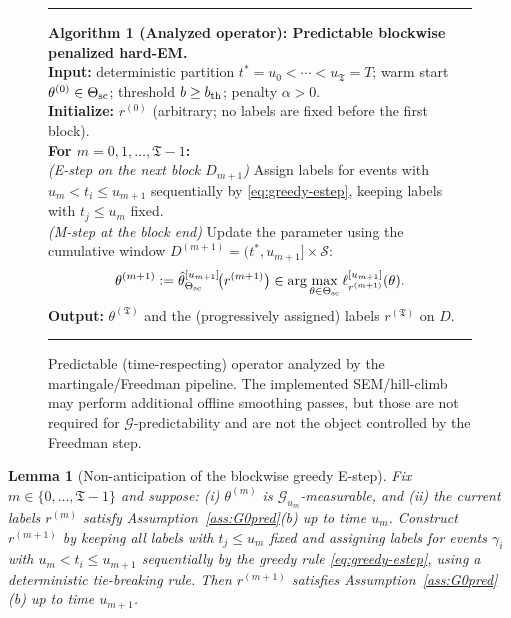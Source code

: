 \documentclass{statsoc}
\newtheorem{lemma}[lemma]{Lemma}
\newcommand{\1}{\mathbbm{1}}
\newcommand{\Tmax}{\mathfrak{T}}
\begin{document}
\begin{figure}[t]
\centering
\begin{minipage}{0.97\linewidth}
\hrule\vspace{0.6em}
\textbf{Algorithm 1 (Analyzed operator): Predictable blockwise penalized hard-EM.}\\[0.3em]
\textbf{Input:} deterministic partition $t^\ast=u_0<\cdots<u_{\Tmax}=T$; warm start $\theta^{(0)}\in\Theta_{\rm sc}$;
threshold $b\ge b_{\rm th}$; penalty $\alpha>0$.\\
\textbf{Initialize:} $r^{(0)}$ (arbitrary; no labels are fixed before the first block).\\[0.2em]
\textbf{For $m=0,1,\dots,\Tmax-1$:}\\
\quad\emph{(E-step on the next block $D_{m+1}$)} Assign labels for events with $u_m<t_i\le u_{m+1}$ sequentially by
\eqref{eq:greedy-estep}, keeping labels with $t_j\le u_m$ fixed.\\
\quad\emph{(M-step at the block end)} Update the parameter using the cumulative window $D^{(m+1)}=(t^\ast,u_{m+1}]\times\mathcal S$:
\[
\theta^{(m+1)} := \hat\theta_{\Theta_{\rm sc}}^{[u_{m+1}]}\!\big(r^{(m+1)}\big)
\in \arg\max_{\theta\in\Theta_{\rm sc}}\ell_{r^{(m+1)}}^{[u_{m+1}]}(\theta).
\]
\textbf{Output:} $\theta^{(\Tmax)}$ and the (progressively assigned) labels $r^{(\Tmax)}$ on $D$.
\vspace{0.6em}\hrule
\end{minipage}
\caption{Predictable (time-respecting) operator analyzed by the martingale/Freedman pipeline.
The implemented SEM/hill-climb may perform additional offline smoothing passes, but those are not required for
$\mathcal G$-predictability and are not the object controlled by the Freedman step.}
\label{alg:blockwise-hardem}
\end{figure}

\begin{lemma}[Non-anticipation of the blockwise greedy E-step]\label{lem:greedy-G0pred}
Fix $m\in\{0,\dots,\Tmax-1\}$ and suppose:
(i) $\theta^{(m)}$ is $\mathcal G_{u_m}$-measurable, and
(ii) the current labels $r^{(m)}$ satisfy Assumption~\ref{ass:G0pred}(b) up to time $u_m$. Construct $r^{(m+1)}$ by keeping all labels with $t_j\le u_m$ fixed and assigning labels for events $\gamma_i$ with $u_m<t_i\le u_{m+1}$ sequentially by the greedy rule \eqref{eq:greedy-estep}, using a deterministic tie-breaking rule.  Then $r^{(m+1)}$ satisfies Assumption~\ref{ass:G0pred}(b) up to time $u_{m+1}$.
\end{lemma}
\end{document}
